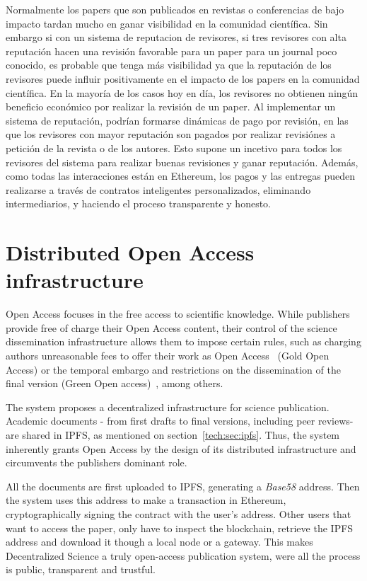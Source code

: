 \begin{itemize}
   Normalmente los papers
  que son publicados en revistas o conferencias de bajo impacto tardan mucho en
  ganar visibilidad en la comunidad científica. Sin embargo si con un sistema de
  reputacion de revisores, si tres revisores con alta reputación hacen una
  revisión favorable para un paper para un journal poco conocido, es probable
  que tenga más visibilidad ya que la reputación de los revisores puede influir
  positivamente en el impacto de los papers en la comunidad científica.
   En la mayoría de los casos hoy en día, los
  revisores no obtienen ningún beneficio económico por realizar la revisión de
  un paper. Al implementar un sistema de reputación, podrían formarse dinámicas
  de pago por revisión, en las que los revisores con mayor reputación son
  pagados por realizar  revisiónes a petición de la revista o de los autores.
  Esto supone un incetivo para todos los revisores del sistema para realizar
  buenas revisiones y ganar reputación. Además, como todas las interacciones
  están en Ethereum, los pagos y las entregas pueden realizarse a través de
  contratos inteligentes personalizados, eliminando intermediarios, y haciendo
  el proceso transparente y honesto.
\end{itemize}

\section{Distributed Open Access infrastructure}
\label{distributedOA}
Open Access focuses in the free access to scientific knowledge. While publishers
provide free of charge their Open Access content, their control of the science
dissemination infrastructure allows them to impose certain rules, such as
charging authors unreasonable fees to offer their work as Open
Access~\cite{solomon2012study} (Gold Open Access) or the temporal embargo and
restrictions on the dissemination of the final version (Green Open
access)~\cite{bjork2014anatomy}, among others. 

The system proposes a decentralized infrastructure for science publication.
Academic documents - from first drafts to final versions, including peer
reviews- are shared in IPFS, as mentioned on section~\ref{tech:sec:ipfs}.
Thus, the system inherently grants Open Access by the design of its distributed
infrastructure and circumvents the publishers dominant role.

All the documents are first uploaded to IPFS, generating a \emph{Base58}
address. Then the system uses this address to make a transaction in Ethereum,
cryptographically signing the contract with the user's address. Other users that
want to access the paper, only have to inspect the blockchain, retrieve the IPFS
address and download it though a local node or a gateway. This makes
Decentralized Science a truly open-access publication system, were all the
process is public, transparent and trustful.




